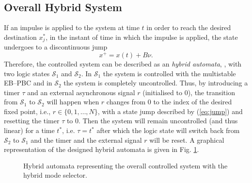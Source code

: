 \subsection{Overall Hybrid System}
%
If an impulse is applied to the system at time $t$  in order to reach the desired destination $x_j^*$, in the instant of time in which the impulse is applied, the state undergoes to a discontinuous jump
%
\begin{equation}\label{eq:jump}
    x^+ = x(t) + B\nu.
\end{equation}
%
Therefore, the controlled system can be described as an \textit{hybrid automata},  \citealp{van2000introduction}, with two logic states $\mathcal{S}_1$ and $\mathcal{S}_2$. In $\mathcal{S}_1$ the system is controlled with the multistable EB--PBC and in $\mathcal{S}_2$ the system is completely uncontrolled. Thus, by introducing a timer $\tau$ and an external asynchronous signal $r$ (initialised to $0$), the transition from $\mathcal{S}_1$ to $\mathcal{S}_2$ will happen when $r$ changes from $0$ to the index of the desired fixed point, i.e., $r\in\{0,1,\dots,N\}$, with a state jump described by (\ref{eq:jump}) and resetting the timer $\tau$ to $0$. Then the system will remain uncontrolled (and thus linear) for a time $t^*$, i.e. $\tau = t^*$ after which the logic state will switch back from $\mathcal{S}_2$ to $\mathcal{S}_1$  and the timer and the external signal $r$ will be reset. A graphical representation of the designed hybrid automata is given in Fig. \ref{fig:automata}. 
%
\begin{figure}[!t]
	\centering
	
	\vspace{-5mm}
	\caption{\footnotesize Hybrid automata representing the overall controlled system with the hybrid mode selector.}
	\label{fig:automata}
\end{figure}
%
